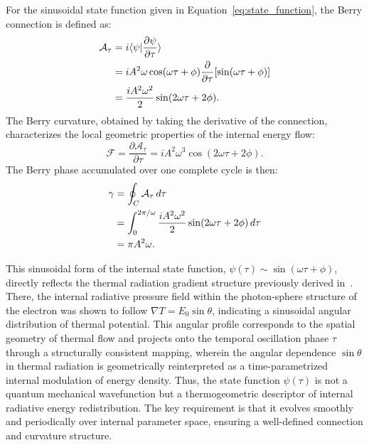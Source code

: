 \documentclass[%
 reprint,
 amsmath,amssymb,
 aps,
]{revtex4-1}
\numberwithin{equation}{section}%
\begin{document}
For the sinusoidal state function given in Equation~\eqref{eq:state_function}, the Berry connection is defined as:
\begin{align}
\mathcal{A}_\tau &= i \langle \psi | \frac{\partial \psi}{\partial \tau} \rangle \notag \\
&= i A^2 \omega \cos(\omega \tau + \phi) \frac{\partial}{\partial \tau}[\sin(\omega \tau + \phi)] \notag \\
&= \frac{i A^2 \omega^2}{2} \sin(2\omega \tau + 2\phi). \label{eq:berry_connection}
\end{align}
The Berry curvature, obtained by taking the derivative of the connection, characterizes the local geometric properties of the internal energy flow:
\begin{equation}
\mathcal{F} = \frac{\partial \mathcal{A}_\tau}{\partial \tau} = i A^2 \omega^3 \cos(2\omega \tau + 2\phi). \label{eq:berry_curvature}
\end{equation}
The Berry phase accumulated over one complete cycle is then:
\begin{align}
\gamma &= \oint_C \mathcal{A}_\tau \, d\tau \notag \\
&= \int_0^{2\pi/\omega} \frac{i A^2 \omega^2}{2} \sin(2\omega \tau + 2\phi) \, d\tau \notag \\
&= \pi A^2 \omega. \label{eq:total_berry_phase}
\end{align}

This sinusoidal form of the internal state function, $\psi(\tau) \sim \sin(\omega \tau + \phi)$, directly reflects the thermal radiation gradient structure previously derived in~\cite{hanamura1811.0312}. There, the internal radiative pressure field within the photon-sphere structure of the electron was shown to follow $\nabla T = E_0 \sin\theta$, indicating a sinusoidal angular distribution of thermal potential. This angular profile corresponds to the spatial geometry of thermal flow and projects onto the temporal oscillation phase $\tau$ through a structurally consistent mapping, wherein the angular dependence $\sin\theta$ in thermal radiation is geometrically reinterpreted as a time-parametrized internal modulation of energy density. Thus, the state function $\psi(\tau)$ is not a quantum mechanical wavefunction but a thermogeometric descriptor of internal radiative energy redistribution. The key requirement is that it evolves smoothly and periodically over internal parameter space, ensuring a well-defined connection and curvature structure.
\end{document}
